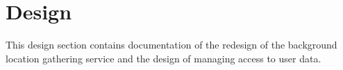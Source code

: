 \section{Design}
This design section contains documentation of the redesign of the background location gathering service and the design of managing access to user data.





